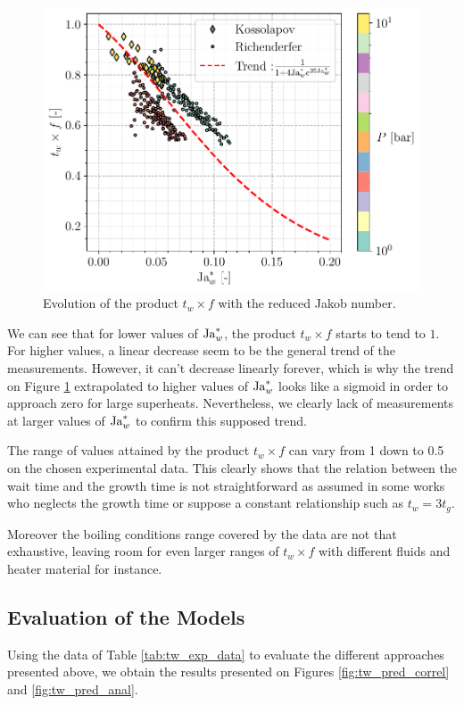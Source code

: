 \begin{figure}[!h]
\centering
\includegraphics[width=0.6\linewidth]{img/tw/Jawred_twf.pdf}
\caption{Evolution of the product $t_{w} \times f$ with the reduced Jakob number.}%
\label{fig:twf_Jawred}
\end{figure}

We can see that for lower values of $\mathrm{Ja}_{w}^{*}$, the product $t_{w} \times f$ starts to tend to $1$. For higher values, a linear decrease seem to be the general trend of the measurements. However, it can't decrease linearly forever, which is why the trend on Figure \ref{fig:twf_Jawred} extrapolated to higher values of $\mathrm{Ja}_{w}^{*}$ looks like a sigmoid in order to approach zero for large superheats. Nevertheless, we clearly lack of measurements at larger values of $\mathrm{Ja}_{w}^{*}$ to confirm this supposed trend.

\begin{remark*}{}
The range of values attained by the product $t_{w} \times f$ can vary from 1 down to 0.5 on the chosen experimental data. This clearly shows that the relation between the wait time and the growth time is not straightforward as assumed in some works who neglects the growth time or suppose a constant relationship such as $t_{w}=3t_{g}$\cite{chi-yeh_mechanism_1965}.

\npar
Moreover the boiling conditions range covered by the data are not that exhaustive, leaving room for even larger ranges of $t_{w} \times f$ with different fluids and heater material for instance.
\end{remark*}

\subsection{Evaluation of the Models}

Using the data of Table \ref{tab:tw_exp_data} to evaluate the different approaches presented above, we obtain the results presented on Figures \ref{fig:tw_pred_correl} and \ref{fig:tw_pred_anal}.



